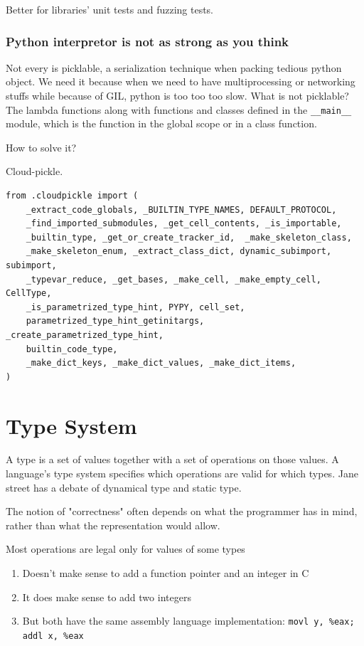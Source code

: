 \documentclass[a4paper]{exam}
\begin{document}
Better for libraries' unit tests and fuzzing tests.

\subsubsection{Python interpretor is not as strong as you think}
Not every is picklable, a serialization technique when packing tedious python object. We need it because when we need to have multiprocessing or networking stuffs while because of GIL, python is too too too slow. What is not picklable?
The lambda functions along with functions and classes defined in the \texttt{\_\_main\_\_} module, which is the function in the global scope or in a class function.

How to solve it?

Cloud-pickle.
\begin{verbatim}
from .cloudpickle import (
    _extract_code_globals, _BUILTIN_TYPE_NAMES, DEFAULT_PROTOCOL,
    _find_imported_submodules, _get_cell_contents, _is_importable,
    _builtin_type, _get_or_create_tracker_id,  _make_skeleton_class,
    _make_skeleton_enum, _extract_class_dict, dynamic_subimport, subimport,
    _typevar_reduce, _get_bases, _make_cell, _make_empty_cell, CellType,
    _is_parametrized_type_hint, PYPY, cell_set,
    parametrized_type_hint_getinitargs, _create_parametrized_type_hint,
    builtin_code_type,
    _make_dict_keys, _make_dict_values, _make_dict_items,
)
\end{verbatim}
\section{Type System}
A type is a set of values together with a set of operations on those values. A language's type system specifies which operations are valid for which types. Jane street has a debate of dynamical type and static type. \cite{janestreetcode}


The notion of "correctness" often depends on what the programmer has in mind, rather than what the representation would allow.

Most operations are legal only for values of some types
\begin{enumerate}
  \item Doesn't make sense to add a function pointer and an integer in C
  \item It does make sense to add two integers
  \item But both have the same assembly language implementation: \texttt{movl y, \%eax;  addl x, \%eax}
\end{enumerate}
\end{document}
